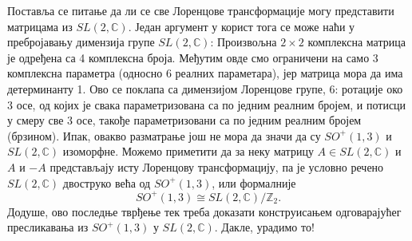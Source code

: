 \documentclass{report}
\theoremstyle{plain}
\theoremstyle{definition}
\begin{document}
Поставља се питање да ли се све Лоренцове трансформације могу представити матрицама из $SL(2, \mathbb{C})$. Један аргумент у корист тога се може наћи у пребројавању димензија групе $SL(2, \mathbb{C})$: Произвољна $2\times 2$ комплексна матрица је одређена са 4 комплексна броја. Међутим овде смо ограничени на само 3 комплексна параметра (односно 6 реалних параметара), јер матрица мора да има детерминанту 1. Ово се поклапа са димензијом Лоренцове групе, 6: ротације око 3 осе, од којих је свака параметризована са по једним реалним бројем, и потисци у смеру све 3 осе, такође параметризовани са по једним реалним бројем (брзином). Ипак, овакво разматрање још не мора да значи да су $SO^+(1, 3)$ и $SL(2, \mathbb{C})$ изоморфне. Можемо приметити да за неку матрицу $A\in SL(2, \mathbb{C})$ и $A$ и $-A$ представљају исту Лоренцову трансформацију, па је условно речено $SL(2, \mathbb{C})$ двоструко већа од $SO^+(1, 3)$, или формалније
$$SO^+(1, 3) \cong SL(2, \mathbb{C})/\mathbb{Z}_2.$$
Додуше, ово последње тврђење тек треба доказати конструисањем одговарајућег пресликавања из $SO^+(1, 3)$ у $SL(2, \mathbb{C})$. Дакле, урадимо то!
\end{document}
